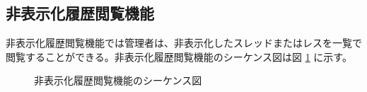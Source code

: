 \documentclass[a4j]{jarticle}
\begin{document}
  \subsection{非表示化履歴閲覧機能}
  非表示化履歴閲覧機能では管理者は、非表示化したスレッドまたはレスを一覧で閲覧することができる。非表示化履歴閲覧機能のシーケンス図は図 \ref{fig:admin_bbs_hide-history.png} に示す。
  \begin{figure}[H]
    \centering
    \caption{非表示化履歴閲覧機能のシーケンス図}
    \label{fig:admin_bbs_hide-history.png}
  \end{figure}
\end{document}
